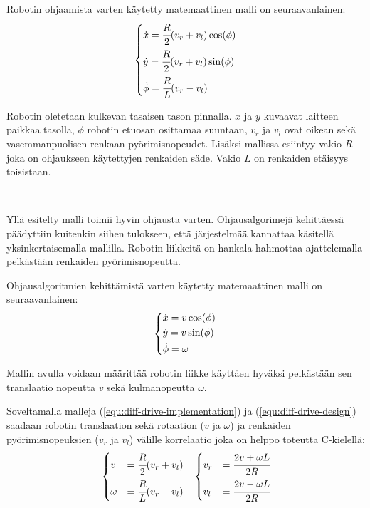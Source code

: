 \documentclass[]{article} %
\numberwithin{equation}{section}
\numberwithin{figure}{section}
\numberwithin{table}{section}
\begin{document}
Robotin ohjaamista varten käytetty matemaattinen malli on seuraavanlainen:
\begin{align}
    \label{equ:diff-drive-implementation}
    \begin{dcases}
        \dot x = \cfrac{R}{2} (v_r + v_l) \cos (\phi)\\
        \dot y = \cfrac{R}{2} (v_r + v_l) \sin (\phi)\\
        \dot \phi = \cfrac{R}{L} (v_r - v_l)   
    \end{dcases}
\end{align}

Robotin oletetaan kulkevan tasaisen tason pinnalla. $x$ ja $y$ kuvaavat laitteen paikkaa tasolla, $\phi$ robotin etuosan osittamaa suuntaan, $v_r$ ja $v_l$ ovat oikean sekä vasemmanpuolisen renkaan pyörimisnopeudet. Lisäksi mallissa esiintyy vakio $R$ joka on ohjaukseen käytettyjen renkaiden säde. Vakio $L$ on renkaiden etäisyys toisistaan.


---

Yllä esitelty malli toimii hyvin ohjausta varten.
Ohjausalgorimejä kehittäessä päädyttiin kuitenkin siihen tulokseen, että järjestelmää kannattaa käsitellä  yksinkertaisemalla mallilla. Robotin liikkeitä on hankala hahmottaa ajattelemalla pelkästään renkaiden pyörimisnopeutta.

Ohjausalgoritmien kehittämistä varten käytetty matemaattinen malli on seuraavanlainen:
\begin{align}
    \label{equ:diff-drive-design}
    \begin{dcases}
        \dot x = v \cos(\phi)\\
        \dot y = v \sin(\phi)\\
        \dot \phi = \omega
    \end{dcases}
\end{align}

Mallin avulla voidaan määrittää robotin liikke käyttäen hyväksi pelkästään sen translaatio nopeutta $v$ sekä kulmanopeutta $\omega$.

Soveltamalla malleja (\ref{equ:diff-drive-implementation}) ja (\ref{equ:diff-drive-design}) saadaan robotin translaation sekä rotaation ($v$ ja $\omega$) ja renkaiden pyörimisnopeuksien ($v_r$ ja $v_l$) välille korrelaatio joka on helppo toteutta C-kielellä:
\begin{align}
    \label{equ:diff-drive-correlation}
    &
    \begin{dcases}
        v &= \cfrac{R}{2} (v_r + v_l)\\
        \omega &= \cfrac{R}{L} (v_r - v_l)\\
    \end{dcases}
    &
    \begin{dcases}
        v_r &= \cfrac{2v + \omega L}{2R}\\
        v_l &= \cfrac{2v - \omega L}{2R}\\
    \end{dcases}
\end{align}
\end{document}
